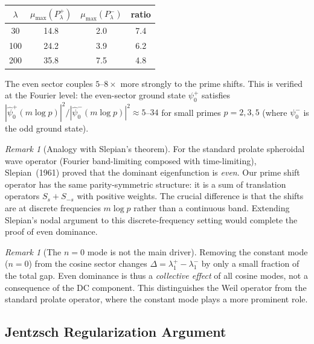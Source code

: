 \documentclass[12pt,a4paper]{article}
\theoremstyle{definition}
\theoremstyle{remark}
\newtheorem{remark}[theorem]{Remark}
\begin{document}
\begin{center}
\begin{tabular}{cccc}
$\lambda$ & $\mu_{\max}(P_\lambda^+)$ & $\mu_{\max}(P_\lambda^-)$ & ratio \\
\hline
30  & 14.8 &  2.0 & 7.4 \\
100 & 24.2 &  3.9 & 6.2 \\
200 & 35.8 &  7.5 & 4.8
\end{tabular}
\end{center}

The even sector couples $5$--$8\times$ more strongly to the prime shifts. This is verified at the Fourier level: the even-sector ground state $\psi_0^+$ satisfies $|\hat\psi_0^+(m\log p)|^2 / |\hat\psi_0^-(m\log p)|^2 \approx 5$--$34$ for small primes $p = 2,3,5$ (where $\psi_0^-$ is the odd ground state).

\begin{remark}[Analogy with Slepian's theorem]
For the standard prolate spheroidal wave operator (Fourier band-limiting composed with time-limiting), Slepian~(1961) proved that the dominant eigenfunction is \emph{even}. Our prime shift operator has the same parity-symmetric structure: it is a sum of translation operators $S_s + S_{-s}$ with positive weights. The crucial difference is that the shifts are at discrete frequencies $m\log p$ rather than a continuous band. Extending Slepian's nodal argument to this discrete-frequency setting would complete the proof of even dominance.
\end{remark}

\begin{remark}[The $n=0$ mode is not the main driver]
Removing the constant mode ($n=0$) from the cosine sector changes $\Delta = \lambda_1^+ - \lambda_1^-$ by only a small fraction of the total gap. Even dominance is thus a \emph{collective effect} of all cosine modes, not a consequence of the DC component. This distinguishes the Weil operator from the standard prolate operator, where the constant mode plays a more prominent role.
\end{remark}

\subsection{Jentzsch Regularization Argument}
\end{document}

